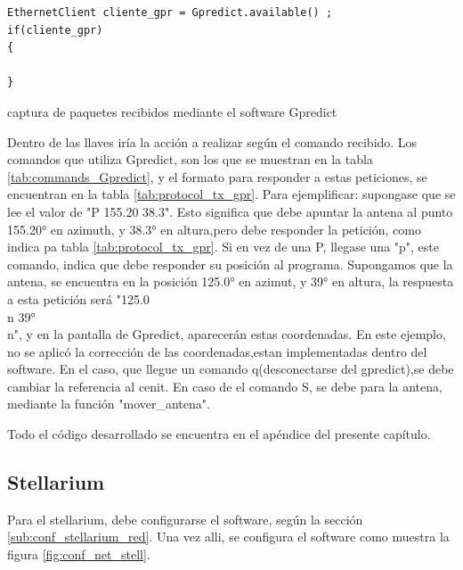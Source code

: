 \begin{listing}[ht]
	\begin{verbatim}
EthernetClient cliente_gpr = Gpredict.available() ;
if(cliente_gpr)
{

}
	\end{verbatim}
\caption{captura de paquetes recibidos mediante el software Gpredict}
\label{cod:cliente_gpr}
\end{listing}

Dentro de las llaves iría la acción a realizar según el comando recibido. Los comandos que utiliza Gpredict, son los que se muestran en la tabla \ref{tab:commands_Gpredict}, y el formato para responder a estas peticiones, se encuentran en la tabla \ref{tab:protocol_tx_gpr}.
Para ejemplificar: supongase que se lee el valor de "P 155.20 38.3". Esto significa que debe apuntar la antena al punto 155.20° en azimuth, y 38.3° en altura,pero  debe responder la petición, como indica pa tabla \ref{tab:protocol_tx_gpr}. Si en vez de una P, llegase una "p", este comando, indica que debe responder su posición al programa. Supongamos que la antena, se encuentra en la posición 125.0° en azimut, y 39° en altura, la respuesta a esta petición será "125.0\\n 39°\\n", y en la pantalla de Gpredict, aparecerán estas coordenadas. En este ejemplo, no se aplicó la corrección de las coordenadas,estan implementadas dentro del software. En el caso, que llegue un comando q(desconectarse del gpredict),se debe cambiar la referencia al cenit. En caso de el comando S, se debe para la antena, mediante la función "mover\_antena". 

Todo el código desarrollado se encuentra en el apéndice del presente capítulo. 




\subsection{Stellarium}

Para el stellarium, debe configurarse el software, según la sección \ref{sub:conf_stellarium_red}. Una vez alli, se configura el software como muestra la figura \ref{fig:conf_net_stell}. 

